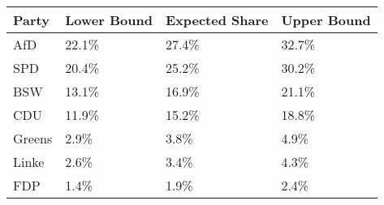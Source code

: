 \begin{tabular}{llll}
  \hline
Party & Lower Bound & Expected Share & Upper Bound \\ 
  \hline
AfD & 22.1\% & 27.4\% & 32.7\% \\ 
  SPD & 20.4\% & 25.2\% & 30.2\% \\ 
  BSW & 13.1\% & 16.9\% & 21.1\% \\ 
  CDU & 11.9\% & 15.2\% & 18.8\% \\ 
  Greens & 2.9\% & 3.8\% & 4.9\% \\ 
  Linke & 2.6\% & 3.4\% & 4.3\% \\ 
  FDP & 1.4\% & 1.9\% & 2.4\% \\ 
   \hline
\end{tabular}
